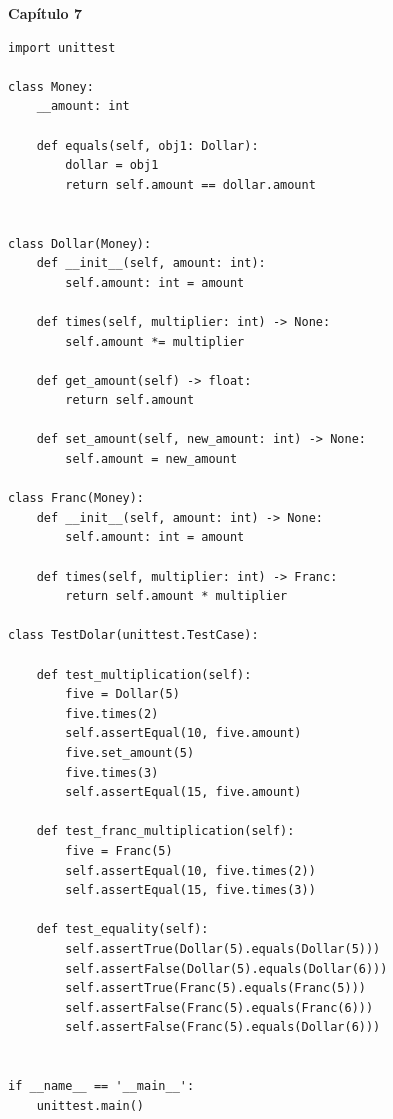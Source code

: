 \documentclass[a4paper,12pt]{article}
\newcommand{\capitulo}[1]{
    \vspace{1em}
    \noindent
    \colorbox{black!15}{
        \parbox{\dimexpr\linewidth-2\fboxsep}{
            \centering \Large \textbf{#1}
        }
    }
    \vspace{1em}
}
\begin{document}
\capitulo{Capítulo 7}
\begin{lstlisting}[style=pythonstyle]
import unittest

class Money:
    __amount: int

    def equals(self, obj1: Dollar):
        dollar = obj1
        return self.amount == dollar.amount


class Dollar(Money):
    def __init__(self, amount: int):
        self.amount: int = amount

    def times(self, multiplier: int) -> None:
        self.amount *= multiplier

    def get_amount(self) -> float:
        return self.amount

    def set_amount(self, new_amount: int) -> None:
        self.amount = new_amount

class Franc(Money):
    def __init__(self, amount: int) -> None:
        self.amount: int = amount

    def times(self, multiplier: int) -> Franc:
        return self.amount * multiplier

class TestDolar(unittest.TestCase):

    def test_multiplication(self):
        five = Dollar(5)
        five.times(2) 
        self.assertEqual(10, five.amount)
        five.set_amount(5)
        five.times(3) 
        self.assertEqual(15, five.amount)

    def test_franc_multiplication(self):
        five = Franc(5)
        self.assertEqual(10, five.times(2))
        self.assertEqual(15, five.times(3))

    def test_equality(self):
        self.assertTrue(Dollar(5).equals(Dollar(5)))
        self.assertFalse(Dollar(5).equals(Dollar(6)))
        self.assertTrue(Franc(5).equals(Franc(5)))
        self.assertFalse(Franc(5).equals(Franc(6)))
        self.assertFalse(Franc(5).equals(Dollar(6)))


if __name__ == '__main__':
    unittest.main()
\end{lstlisting}
\end{document}
